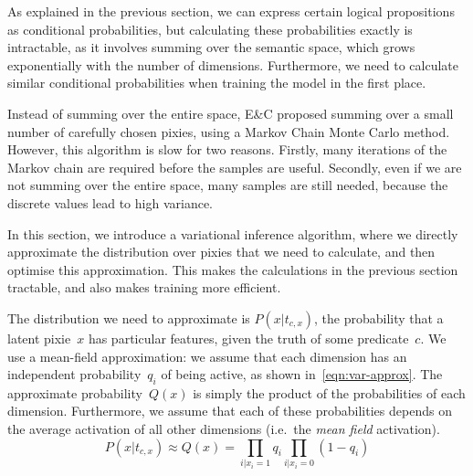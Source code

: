 \documentclass[11pt]{article}
\begin{document}
As explained in the previous section,
we can express certain logical propositions as conditional probabilities,
but calculating these probabilities exactly is intractable,
as it involves summing over the semantic space,
which grows exponentially with the number of dimensions.
Furthermore, we need to calculate similar conditional probabilities
when training the model in the first place.

Instead of summing over the entire space, E\&C proposed
summing over a small number of carefully chosen pixies,
using a Markov Chain Monte Carlo method.
However, this algorithm is slow for two reasons.
Firstly, many iterations of the Markov chain are required
before the samples are useful.
Secondly, even if we are not summing over the entire space,
many samples are still needed,
because the discrete values lead to high variance.

In this section, we introduce a variational inference algorithm,
where we directly approximate the distribution over pixies that we need to calculate,
and then optimise this approximation.
This makes the calculations in the previous section tractable,
and also makes training more efficient.

The distribution we need to approximate is ${P(x|t_{c,x})}$,
the probability that a latent pixie~$x$ has particular features,
given the truth of some predicate~$c$.
We use a mean-field approximation:
we assume that each dimension has an independent probability~$q_i$ of being active,
as shown in~\cref{eqn:var-approx}.
The approximate probability~$Q(x)$ is simply the product of the probabilities of each dimension.
Furthermore, we assume that each of these probabilities
depends on the average activation of all other dimensions
(i.e.\ the \textit{mean field} activation).
%
\begin{equation}
P(x|t_{c,x}) \approx Q(x) = \!\prod_{i|x_i=1}\! q_i \!\prod_{i|x_i=0}\! (1-q_i)
\label{eqn:var-approx}
\end{equation}
\end{document}
